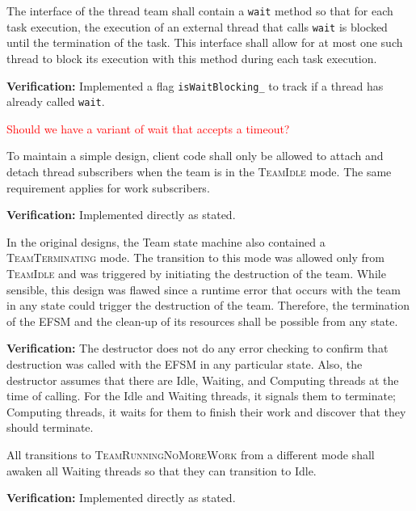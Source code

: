 \documentclass{article}
\newcommand{\TeamIdle}          {\textsc{TeamIdle}}
\newcommand{\TeamRunningNoMoreWork} {\textsc{TeamRunningNoMoreWork}}
\newcommand{\TeamTerminating}   {\textsc{TeamTerminating}}
\begin{document}
\begin{spec}
\label{spec:Runtime_OneWait}
The interface of the thread team shall contain a \texttt{wait} method so that
for each task execution, the execution of an external thread that calls
\texttt{wait} is blocked until the termination of the task.  This interface
shall allow for at most one such thread to block its execution with this method
during each task execution.
\end{spec}
\textbf{Verification:}\hspace{0.125in}  Implemented a flag
\texttt{isWaitBlocking\_} to track if a thread has already called \texttt{wait}.

\textcolor{red}{Should we have a variant of wait that accepts a timeout?}

\begin{spec}
To maintain a simple design, client code shall only be allowed to attach and
detach thread subscribers when the team is in the {\TeamIdle} mode.  The same
requirement applies for work subscribers.
\end{spec}
\textbf{Verification:}\hspace{0.125in} Implemented directly as stated.

\begin{spec}
In the original designs, the Team state machine also contained a
{\TeamTerminating} mode.  The transition to this mode was allowed only from
{\TeamIdle} and was triggered by initiating the destruction of the team.  While
sensible, this design was flawed since a runtime error that occurs with the team
in any state could trigger the destruction of the team.  Therefore, the
termination of the EFSM and the clean-up of its resources shall be possible from
any state.
\end{spec}
\textbf{Verification:}\hspace{0.125in}  The destructor does not do any error
checking to confirm that destruction was called with the EFSM in any particular
state.  Also, the destructor assumes that there are Idle, Waiting, and Computing
threads at the time of calling.  For the Idle and Waiting threads, it signals 
them to terminate; Computing threads, it waits for them to finish their work and
discover that they should terminate.

\begin{spec}
\label{spec:Runtime_AwakenOnNoMoreWork}
All transitions to {\TeamRunningNoMoreWork} from a different mode shall awaken
all Waiting threads so that they can transition to Idle.
\end{spec}
\textbf{Verification:}\hspace{0.125in}  Implemented directly as stated.
\end{document}
